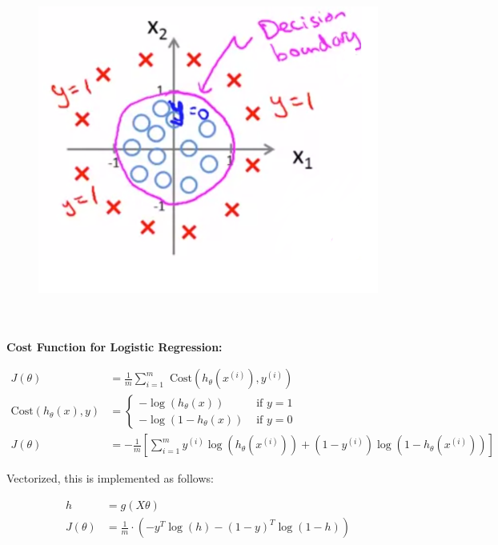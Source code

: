 \begin{figure}[hbt!]
    \centering
    \includegraphics[scale=0.5]{Resources/Decision_Boundary2}
\end{figure} \\\\

\noindent \textbf{Cost Function for Logistic Regression:}

\begin{align*}
    J(\theta)   &= \frac{1}{m}\sum^m_{i=1}\text{ Cost}(h_{\theta}(x^{(i)}),y^{(i)}) \\
    \text{Cost}(h_{\theta}(x),y) &=
    \begin{cases}
        -\log{(h_{\theta}(x))}   & \text{ if } y=1 \\
        -\log{(1-h_{\theta}(x))} & \text{ if } y=0
    \end{cases} \\
    J(\theta)   &= -\frac{1}{m}\left[
    \sum^m_{i=1}y^{(i)}\log({h_\theta (x^{(i)})}) + (1-y^{(i)})\log{(1-h_\theta (x^{(i)}))}
    \right]
\end{align*}

\noindent Vectorized, this is implemented as follows:

\begin{align*}
    h   &= g(X\theta) \\
    J(\theta) &= \frac{1}{m}\cdot\left(-y^T \log{(h)}-(1-y)^T \log{(1-h)}\right)
\end{align*}

